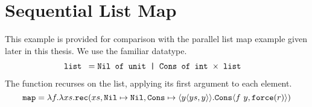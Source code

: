\section{Sequential List Map}
\label{sec:sequential_list_map}

This example is provided for comparison with the parallel list map example
given later in this thesis. We use the familiar  datatype.
%
\begin{align*}
\texttt{list } &= \texttt{Nil of unit | Cons of int $\times$ list}
\end{align*}
%
The  function recurses on the list, applying its first argument to each
element.
%
\begin{equation*}
  \texttt{map} = \lambda f. \lambda xs . \texttt{rec}(xs, \texttt{Nil} \mapsto \texttt{Nil}, \texttt{Cons} \mapsto \langle y \langle ys, y \rangle\rangle. \texttt{Cons}\langle f\ y, \texttt{force}(r)\rangle)
\end{equation*}

